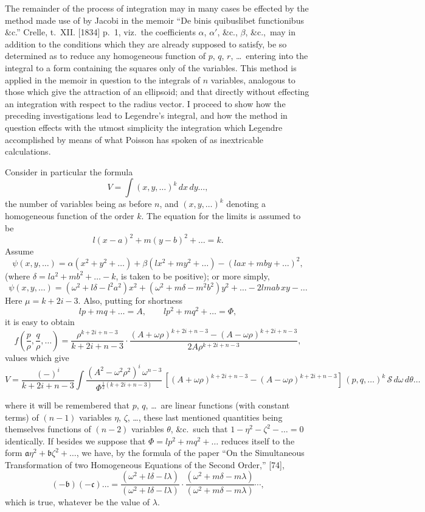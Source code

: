 \documentclass[11pt,a4paper]{article}
\theoremstyle{definition}
\begin{document}
The remainder of the process of integration may in many cases be effected by the method made use of by Jacobi in the memoir ``De binis quibuslibet functionibus \&c.'' Crelle, t.~XII. [1834] p.~1, viz.\ the coefficients $\alpha$, $\alpha'$, \&c., $\beta$, \&c.,\ may in addition to the conditions which they are already supposed to satisfy, be so determined as to reduce any homogeneous function of $p$, $q$, $r$, \ldots\ entering into the integral to a form containing the squares only of the variables. This method is applied in the memoir in question to the integrals of $n$ variables, analogous to those which give the attraction of an ellipsoid; and that directly without effecting an integration with respect to the radius vector. I proceed to show how the preceding investigations lead to Legendre's integral, and how the method in question effects with the utmost simplicity the integration which Legendre accomplished by means of what Poisson has spoken of as inextricable calculations.

Consider in particular the formula
\[
V = \int (x, y, \ldots)^{k}\, dx\, dy\ldots,
\]
the number of variables being as before $n$, and $(x, y, \ldots)^{k}$ denoting a homogeneous function of the order $k$. The equation for the limits is assumed to be
\[
l(x-a)^{2} + m(y-b)^{2} + \ldots = k.
\]
Assume
\[
\psi(x, y, \ldots) = \alpha(x^{2} + y^{2} + \ldots) + \beta(lx^{2} + my^{2} + \ldots) - (lax + mby + \ldots)^{2},
\]
(where $\delta = la^{2} + mb^{2} + \ldots - k$, is taken to be positive); or more simply,
\[
\psi(x, y, \ldots) = (\omega^{2} + l\delta - l^{2}a^{2})x^{2} + (\omega^{2} + m\delta - m^{2}b^{2})y^{2} + \ldots - 2lmab\,xy - \ldots
\]
Here $\mu = k + 2i - 3$. Also, putting for shortness
\[
lp + mq + \ldots = A, \qquad lp^{2} + mq^{2} + \ldots = \Phi,
\]
it is easy to obtain
\[
f\left(\frac{p}{\rho}, \frac{q}{\rho}, \ldots\right) = \frac{\rho^{k+2i+n-3}}{k + 2i + n - 3} \cdot \frac{(A + \omega\rho)^{k+2i+n-3} - (A - \omega\rho)^{k+2i+n-3}}{2A\rho^{k+2i+n-3}},
\]
values which give
\[
V = \frac{(-)^{i}}{k + 2i + n - 3} \int \frac{(A^{2} - \omega^{2}\rho^{2})^{i}\, \omega^{n-3}}{\Phi^{\frac{1}{2}(k+2i+n-3)}}\, [(A + \omega\rho)^{k+2i+n-3} - (A - \omega\rho)^{k+2i+n-3}]\, (p, q, \ldots)^{k}\, \mathcal{S}\, d\omega\, d\theta\ldots
\]

\newpage

\setcounter{page}{443}

where it will be remembered that $p$, $q$, \ldots\ are linear functions (with constant terms) of $(n-1)$ variables $\eta$, $\zeta$, \ldots, these last mentioned quantities being themselves functions of $(n-2)$ variables $\theta$, \&c.\ such that $1 - \eta^{2} - \zeta^{2} - \ldots = 0$ identically. If besides we suppose that $\Phi = lp^{2} + mq^{2} + \ldots$ reduces itself to the form $\mathfrak{a}\eta^{2} + \mathfrak{b}\zeta^{2} + \ldots$, we have, by the formula of the paper ``On the Simultaneous Transformation of two Homogeneous Equations of the Second Order,'' [74],
\[
(-\mathfrak{b})(-\mathfrak{c})\ldots =
\frac{(\omega^{2} + l\delta - l\lambda)}{(\omega^{2} + l\delta - l\lambda)} \cdot \frac{(\omega^{2} + m\delta - m\lambda)}{(\omega^{2} + m\delta - m\lambda)} \cdots,
\]
which is true, whatever be the value of $\lambda$.
\end{document}
